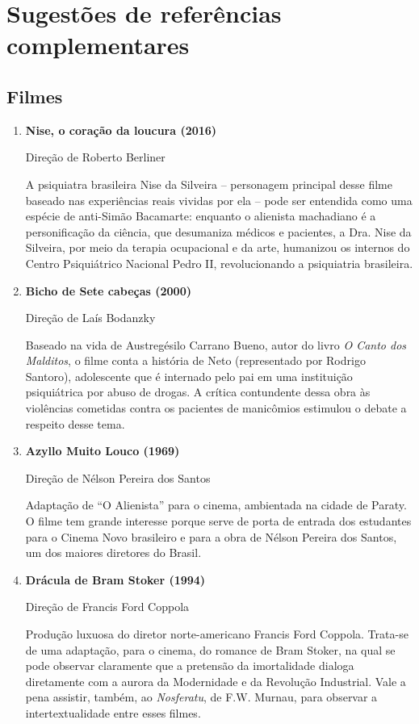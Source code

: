 \documentclass{extarticle}
\begin{document}
\section{Sugestões de referências complementares}

\subsection{Filmes}

\begin{enumerate}
\item\textbf{Nise, o coração da loucura (2016)}

Direção de Roberto Berliner

A psiquiatra brasileira Nise da Silveira -- personagem principal desse
filme baseado nas experiências reais vividas por ela -- pode ser
entendida como uma espécie de anti-Simão Bacamarte: enquanto o alienista
machadiano é a personificação da ciência, que desumaniza médicos e
pacientes, a Dra. Nise da Silveira, por meio da terapia ocupacional e da
arte, humanizou os internos do Centro Psiquiátrico Nacional Pedro II,
revolucionando a psiquiatria brasileira.

\item\textbf{Bicho de Sete cabeças (2000)}

Direção de Laís Bodanzky

Baseado na vida de Austregésilo Carrano Bueno, autor do livro \emph{O
Canto dos Malditos}, o filme conta a história de Neto (representado por
Rodrigo Santoro), adolescente que é internado pelo pai em uma
instituição psiquiátrica por abuso de drogas. A crítica contundente
dessa obra às violências cometidas contra os pacientes de manicômios
estimulou o debate a respeito desse tema.

\item\textbf{Azyllo Muito Louco (1969)}

Direção de Nélson Pereira dos Santos

Adaptação de ``O Alienista'' para o cinema, ambientada na cidade de
Paraty. O filme tem grande interesse porque serve de porta de entrada
dos estudantes para o Cinema Novo brasileiro e para a obra de Nélson
Pereira dos Santos, um dos maiores diretores do Brasil.

\item\textbf{Drácula de Bram Stoker (1994)}

Direção de Francis Ford Coppola

Produção luxuosa do diretor norte-americano Francis Ford Coppola.
Trata-se de uma adaptação, para o cinema, do romance de Bram Stoker, na
qual se pode observar claramente que a pretensão da imortalidade dialoga
diretamente com a aurora da Modernidade e da Revolução Industrial. Vale
a pena assistir, também, ao \emph{Nosferatu}, de F.W. Murnau, para
observar a intertextualidade entre esses filmes.


\end{enumerate}
\end{document}
